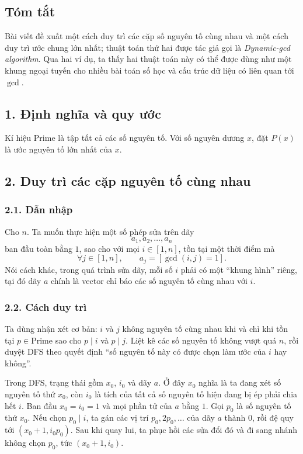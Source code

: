 \documentclass[11pt]{article}
\begin{document}
\subsection*{Tóm tắt}

Bài viết đề xuất một cách duy trì các cặp số nguyên tố cùng nhau và một cách
duy trì ước chung lớn nhất; thuật toán thứ hai được tác giả gọi là
\emph{Dynamic-gcd algorithm}. Qua hai ví dụ, ta thấy hai thuật toán này có thể
được dùng như một khung ngoại tuyến cho nhiều bài toán số học và cấu trúc dữ
liệu có liên quan tới \(\gcd\).

\subsection*{1. Định nghĩa và quy ước}

Kí hiệu \(\mathrm{Prime}\) là tập tất cả các số nguyên tố. Với số nguyên dương
\(x\), đặt \(P(x)\) là ước nguyên tố lớn nhất của \(x\).

\subsection*{2. Duy trì các cặp nguyên tố cùng nhau}

\subsubsection*{2.1. Dẫn nhập}

Cho \(n\). Ta muốn thực hiện một số phép sửa trên dãy
\[
  a_1,a_2,\ldots,a_n
\]
ban đầu toàn bằng \(1\), sao cho với mọi \(i\in[1,n]\), tồn tại một thời điểm
mà
\[
  \forall j\in[1,n],\qquad a_j=[\gcd(i,j)=1].
\]
Nói cách khác, trong quá trình sửa dãy, mỗi số \(i\) phải có một ``khung hình''
riêng, tại đó dãy \(a\) chính là vector chỉ báo các số nguyên tố cùng nhau với
\(i\).

\subsubsection*{2.2. Cách duy trì}

Ta dùng nhận xét cơ bản: \(i\) và \(j\) không nguyên tố cùng nhau khi và chỉ khi
tồn tại \(p\in\mathrm{Prime}\) sao cho \(p\mid i\) và \(p\mid j\). Liệt kê các
số nguyên tố không vượt quá \(n\), rồi duyệt DFS theo quyết định ``số nguyên tố
này có được chọn làm ước của \(i\) hay không''.

Trong DFS, trạng thái gồm \(x_0\), \(i_0\) và dãy \(a\). Ở đây \(x_0\) nghĩa là
ta đang xét số nguyên tố thứ \(x_0\), còn \(i_0\) là tích của tất cả số nguyên
tố hiện đang bị ép phải chia hết \(i\). Ban đầu \(x_0=i_0=1\) và mọi phần tử
của \(a\) bằng \(1\). Gọi \(p_0\) là số nguyên tố thứ \(x_0\). Nếu chọn
\(p_0\mid i\), ta gán các vị trí \(p_0,2p_0,\ldots\) của dãy \(a\) thành \(0\),
rồi đệ quy tới \((x_0+1,i_0p_0)\). Sau khi quay lui, ta phục hồi các sửa đổi
đó và đi sang nhánh không chọn \(p_0\), tức \((x_0+1,i_0)\).
\end{document}
